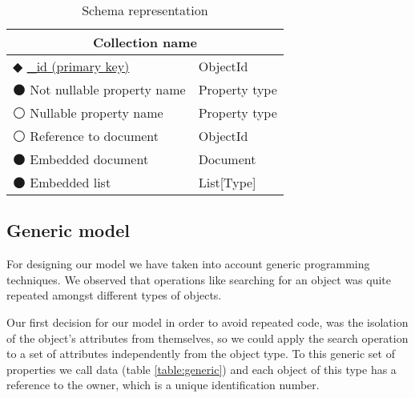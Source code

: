 \begin{table}[!htb]
\centering
\caption{Schema representation}
\label{table:schema}
    \begin{tabular}{|ll|}
        \hline
        \multicolumn{2}{|c|}{\textbf{Collection name}}              \\ \hline
        $\Diamondblack$ \underline{\_id (primary key)}  & ObjectId  \\ 
        $\medbullet$ Not nullable property name  & Property type    \\ 
        $\medcirc$ Nullable property name      & Property type      \\
        $\medcirc$ Reference to document     & ObjectId             \\
        $\medbullet$ Embedded document      & Document              \\ 
        $\medbullet$ Embedded list      & List[Type]                \\ \hline
    \end{tabular}
\end{table}

\subsection {Generic model}

For designing our model we have taken into account generic programming techniques. We observed that operations like searching for an object was quite repeated amongst different types of objects. 

Our first decision for our model in order to avoid repeated code, was the isolation of the object's attributes from themselves, so we could apply the search operation to a set of attributes independently from the object type. To this generic set of properties we call data (table \ref{table:generic}) and each object of this type has a reference to the owner, which is a unique identification number.

